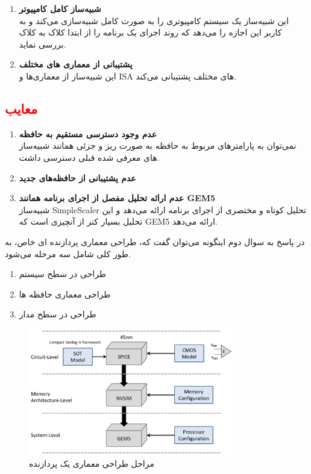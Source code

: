 \documentclass[12pt]{exam}
\begin{document}
\begin{questions}
\begin{enumerate}
 	\item \textbf{شبیه‌ساز کامل کامپیوتر}\\
 	این شبیه‌ساز یک سیستم کامپیوتری را به صورت کامل شبیه‌سازی می‌کند و به کاربر این اجازه را می‌دهد که روند اجرای یک برنامه را از ابتدا کلاک به کلاک بررسی نماید.
 	
 	
 	
 	\item \textbf{پشتیبانی از معماری های مختلف}\\
 	این شبیه‌ساز از معماری‌ها و ISA های مختلف پشتیبانی می‌کند.
 \end{enumerate}
 
 
 \subsection{\textcolor{red}{معایب}}
 \begin{enumerate}
 	\item \textbf{عدم وجود دسترسی مستقیم به حافظه}\\
 	نمی‌توان به پارامتر‌های مربوط به حافظه به صورت ریز و جزئی همانند شبیه‌ساز های معرفی شده قبلی دسترسی داشت.
 	
 	
 	\item \textbf{عدم پشتیبانی از حافظه‌های جدید}\\
 	
 	\item \textbf{عدم ارائه تحلیل مفصل از اجرای برنامه همانند GEM5}\\
 	شبیه‌ساز SimpleScaler تحلیل کوتاه و مختصری از اجرای برنامه ارائه می‌دهد و این تحلیل بسیار کنر از آنچیزی است که GEM5 ارائه می‌دهد. \newpage

 	
 \end{enumerate}
 
 
 
 \question 
 در پاسخ به سوال دوم اینگونه می‌توان گفت که، طراحی معماری پردازنده ای خاص، به طور کلی شامل سه مرحله می‌شود.
 
  \begin{enumerate}
  	\item طراحی در سطح سیستم
  	\item طراحی معماری حافظه ها
  	\item طراحی در سطح مدار
  \end{enumerate}
  
  \begin{figure}[h]
  	\centering
  	\includegraphics[width=0.8\textwidth]{images/img9}
  	\caption{مراحل طراحی معماری یک پردازنده}
  	\label{مراحل طراحی معماری یک پردازنده}
  \end{figure}
  

\end{questions}
\end{document}

